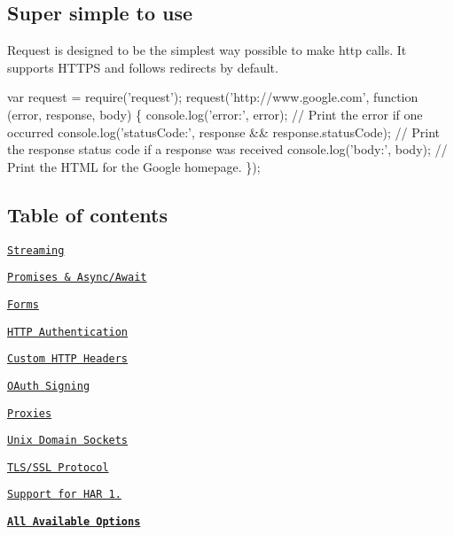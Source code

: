 \href{https://nodei.co/npm/request/}{\tt }

\href{https://travis-ci.org/request/request}{\tt } \href{https://codecov.io/github/request/request?branch=master}{\tt } \href{https://coveralls.io/r/request/request}{\tt } \href{https://david-dm.org/request/request}{\tt } \href{https://snyk.io/test/npm/request}{\tt } \href{https://gitter.im/request/request?utm_source=badge}{\tt }

\subsection*{Super simple to use}

Request is designed to be the simplest way possible to make http calls. It supports H\+T\+T\+PS and follows redirects by default.


\begin{DoxyCode}
var request = require('request');
request('http://www.google.com', function (error, response, body) \{
  console.log('error:', error); // Print the error if one occurred
  console.log('statusCode:', response && response.statusCode); // Print the response status code if a
       response was received
  console.log('body:', body); // Print the HTML for the Google homepage.
\});
\end{DoxyCode}


\subsection*{Table of contents}


\begin{DoxyItemize}
\item \href{#streaming}{\tt Streaming}
\item \href{#promises--asyncawait}{\tt Promises \& Async/\+Await}
\item \href{#forms}{\tt Forms}
\item \href{#http-authentication}{\tt H\+T\+TP Authentication}
\item \href{#custom-http-headers}{\tt Custom H\+T\+TP Headers}
\item \href{#oauth-signing}{\tt O\+Auth Signing}
\item \href{#proxies}{\tt Proxies}
\item \href{#unix-domain-sockets}{\tt Unix Domain Sockets}
\item \href{#tlsssl-protocol}{\tt T\+L\+S/\+S\+SL Protocol}
\item \href{#support-for-har-12}{\tt Support for H\+AR 1.}
\item \href{#requestoptions-callback}{\tt {\bfseries All Available Options}}
\end{DoxyItemize}


